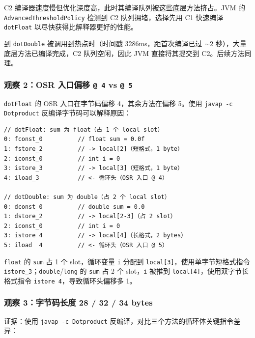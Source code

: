 \documentclass[12pt,a4paper]{article}
\begin{document}
C2 编译器速度慢但优化深度高，此时其编译队列被这些底层方法挤占。JVM 的 \texttt{AdvancedThresholdPolicy} 检测到 C2 队列拥堵，选择先用 C1 快速编译 \texttt{dotFloat} 以尽快获得比解释器更好的性能。

到 \texttt{dotDouble} 被调用到热点时（时间戳 3286ms，距首次编译已过 $\sim$2 秒），大量底层方法已编译完成，C2 队列空闲，因此 JVM 直接将其提交到 C2。后续方法同理。

\subsubsection*{观察 2：OSR 入口偏移 \texttt{@ 4} vs \texttt{@ 5}}

\texttt{dotFloat} 的 OSR 入口在字节码偏移 4，其余方法在偏移 5。使用 \texttt{javap -c Dotproduct} 反编译字节码可以解释原因：

\begin{lstlisting}
// dotFloat: sum 为 float（占 1 个 local slot）
0: fconst_0          // float sum = 0.0f
1: fstore_2          // -> local[2]（短格式，1 byte）
2: iconst_0          // int i = 0
3: istore_3          // -> local[3]（短格式，1 byte）
4: iload_3           // <- 循环头（OSR 入口 @ 4）

// dotDouble: sum 为 double（占 2 个 local slot）
0: dconst_0          // double sum = 0.0
1: dstore_2          // -> local[2-3]（占 2 slot）
2: iconst_0          // int i = 0
3: istore 4          // -> local[4]（长格式，2 bytes）
5: iload  4          // <- 循环头（OSR 入口 @ 5）
\end{lstlisting}

\texttt{float} 的 \texttt{sum} 占 1 个 slot，循环变量 \texttt{i} 分配到 \texttt{local[3]}，使用单字节短格式指令 \texttt{istore\_3}；\texttt{double}/\texttt{long} 的 \texttt{sum} 占 2 个 slot，\texttt{i} 被推到 \texttt{local[4]}，使用双字节长格式指令 \texttt{istore 4}，导致循环头偏移多 1。

\subsubsection*{观察 3：字节码长度 28 / 32 / 34 bytes}

证据：使用 \texttt{javap -c Dotproduct} 反编译，对比三个方法的循环体关键指令差异：
\end{document}

